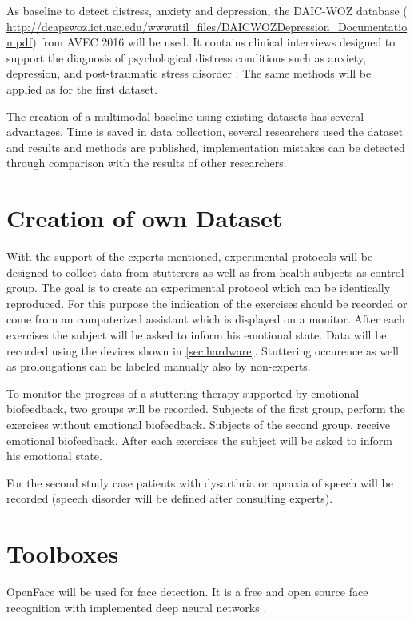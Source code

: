 As baseline to detect distress, anxiety and depression, the DAIC-WOZ database ( \url{http://dcapswoz.ict.usc.edu/wwwutil_files/DAICWOZDepression_Documentation.pdf}) from AVEC 2016 will be used. It contains
clinical interviews designed to support the diagnosis of psychological
distress conditions such as anxiety, depression,
and post-traumatic stress disorder \cite{Valstar2016avec}. The same methods will be applied as for the first dataset.

The creation of a multimodal baseline using existing datasets has several advantages. Time is saved in data collection, several researchers used the dataset and results and methods are published, implementation mistakes can be detected through comparison with the results of other researchers.



\section{Creation of own Dataset}

With the support of the experts mentioned, experimental protocols will be designed to collect data from stutterers as well as from health subjects as control group. The goal is to create an experimental protocol which can be identically reproduced. For this purpose the indication of the exercises should be recorded or come from an computerized assistant which is displayed on a monitor. After each exercises the subject will be asked to inform his emotional state. Data will be recorded using the devices shown in \ref{sec:hardware}. Stuttering occurence as well as prolongations can be labeled manually also by non-experts.

To monitor the progress of a stuttering therapy supported by emotional biofeedback, two groups will be recorded. Subjects of the first group, perform the exercises without emotional biofeedback. Subjects of the second group, receive emotional biofeedback. After each exercises the subject will be asked to inform his emotional state. 


For the second study case patients with dysarthria or apraxia of speech will be recorded (speech disorder will be defined after consulting experts).


\section{Toolboxes}
\label{sec:toolbox}

OpenFace will be used for face detection. It is a free and open source face recognition with implemented deep neural networks \cite{Amos2016openface}.

